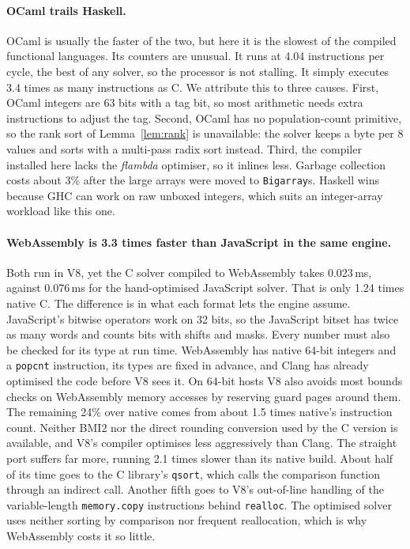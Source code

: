 \documentclass[11pt,a4paper]{article}
\theoremstyle{definition}
\theoremstyle{remark}
\begin{document}
\paragraph{OCaml trails Haskell.}
OCaml is usually the faster of the two, but here it is the slowest of the compiled functional languages.
Its counters are unusual. It runs at 4.04 instructions per cycle, the best of any solver, so the processor
is not stalling. It simply executes 3.4 times as many instructions as C. We attribute this to three
causes. First, OCaml integers are 63 bits with a tag bit, so most arithmetic needs extra
instructions to adjust the tag. Second, OCaml has no population-count primitive, so the rank sort of
Lemma~\ref{lem:rank} is unavailable: the solver keeps a byte per 8 values and sorts with a multi-pass radix sort
instead. Third, the compiler installed here lacks the \emph{flambda} optimiser, so it inlines less.
Garbage collection costs about 3\% after the large arrays were moved to \texttt{Bigarray}s. Haskell wins because GHC
can work on raw unboxed integers, which suits an integer-array workload like this one.

\paragraph{WebAssembly is 3.3 times faster than JavaScript in the same engine.}
Both run in V8, yet the C solver compiled to WebAssembly takes 0.023\,ms, against 0.076\,ms for the
hand-optimised JavaScript solver. That is only 1.24 times native C. The difference is in what each format
lets the engine assume. JavaScript's bitwise operators work on 32 bits, so the JavaScript bitset has twice
as many words and counts bits with shifts and masks. Every number must also be checked for its type at run
time. WebAssembly has native 64-bit integers and a \texttt{popcnt} instruction, its types are fixed in
advance, and Clang has already optimised the code before V8 sees it. On 64-bit hosts V8 also
avoids most bounds checks on WebAssembly memory accesses by reserving guard pages around them. The
remaining 24\% over native comes from about 1.5 times native's instruction count. Neither BMI2 nor the
direct rounding conversion used by the C version is available, and V8's compiler optimises less
aggressively than Clang. The straight port suffers far more, running 2.1 times slower than its native
build. About half of its time goes to the C library's \texttt{qsort}, which calls the comparison function
through an indirect call. Another fifth goes to V8's out-of-line handling of the variable-length
\texttt{memory.copy} instructions behind \texttt{realloc}. The optimised solver uses neither sorting by
comparison nor frequent reallocation, which is why WebAssembly costs it so little.
\end{document}
